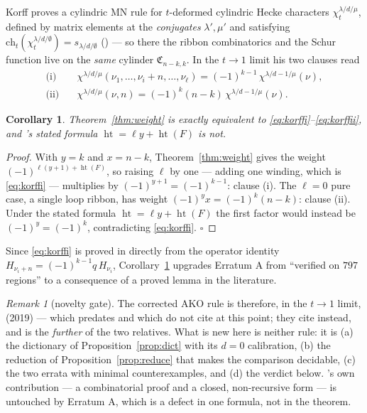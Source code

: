 \documentclass[11pt]{article}
\theoremstyle{plain}
\newtheorem{corollary}[theorem]{Corollary}
\theoremstyle{definition}
\theoremstyle{remark}
\newtheorem{remark}[theorem]{Remark}
\DeclareMathOperator{\hgt}{ht}
\newcommand{\CC}{\mathfrak{C}}
\begin{document}
Korff \cite[\texttt{lem:cylMNrule}]{K19} proves a cylindric MN rule for $t$-deformed cylindric Hecke
characters $\chi^{\lambda/d/\mu}_t$, defined by matrix elements at the \emph{conjugates}
$\lambda',\mu'$ and satisfying $\mathrm{ch}_t(\chi^{\lambda/d/\emptyset}_t)=s_{\lambda/d/\emptyset}$
(\cite[\texttt{cor:cylchi2cylschur}]{K19}) --- so there the ribbon combinatorics and the Schur
function live on the \emph{same} cylinder $\CC_{n-k,k}$. In the $t\to1$ limit
\cite[Remark following \texttt{lem:cylMNrule}]{K19} his two clauses read
\begin{align}
  \text{(i)}\quad & \chi^{\lambda/d/\mu}(\nu_1,\dots,\nu_i+n,\dots,\nu_\ell)=(-1)^{k-1}\,\chi^{\lambda/d-1/\mu}(\nu),
  \label{eq:korffi}\\
  \text{(ii)}\quad & \chi^{\lambda/d/\mu}(\nu,n)=(-1)^{k}(n-k)\,\chi^{\lambda/d-1/\mu}(\nu).
  \label{eq:korffii}
\end{align}

\begin{corollary}\label{cor:korff}
Theorem~\ref{thm:weight} is exactly equivalent to \eqref{eq:korffi}--\eqref{eq:korffii}, and
\cite{AKO}'s stated formula $\hgt=\ell y+\hgt(F)$ is not.
\end{corollary}

\begin{proof}
With $y=k$ and $x=n-k$, Theorem~\ref{thm:weight} gives the weight
$(-1)^{\ell(y+1)+\hgt(F)}$, so raising $\ell$ by one --- adding one winding, which is
\eqref{eq:korffi} --- multiplies by $(-1)^{y+1}=(-1)^{k-1}$: clause (i). The $\ell=0$ pure case, a
single loop ribbon, has weight $(-1)^{y}x=(-1)^k(n-k)$: clause (ii). Under the stated formula
$\hgt=\ell y+\hgt(F)$ the first factor would instead be $(-1)^{y}=(-1)^{k}$, contradicting
\eqref{eq:korffi}. $\square$
\end{proof}

Since \eqref{eq:korffi} is proved in \cite{K19} directly from the operator identity
$H_{\nu_i+n}=(-1)^{k-1}q\,H_{\nu_i}$, Corollary~\ref{cor:korff} upgrades Erratum A from
``verified on $797$ regions'' to a consequence of a proved lemma in the literature.

\begin{remark}[novelty gate]
The corrected AKO rule is therefore, in the $t\to1$ limit, \cite[\texttt{lem:cylMNrule}]{K19}
(2019) --- which predates \cite{AKO} and which \cite{AKO} do not cite at this point; they cite
\cite{KP} instead, and \cite{KP} is the \emph{further} of the two relatives. What is new here is
neither rule: it is (a) the dictionary of Proposition~\ref{prop:dict} with its $d=0$ calibration,
(b) the reduction of Proposition~\ref{prop:reduce} that makes the comparison decidable, (c) the two
errata with minimal counterexamples, and (d) the verdict below. \cite{AKO}'s own contribution
--- a combinatorial proof and a closed, non-recursive form --- is untouched by Erratum A, which is a
defect in one formula, not in the theorem.
\end{remark}
\end{document}
